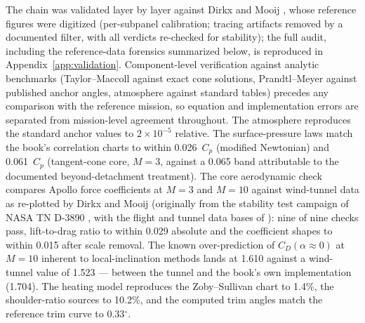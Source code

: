 The chain was validated layer by layer against Dirkx and Mooij
\cite{dirkx2017entry}, whose reference figures were digitized (per-subpanel
calibration; tracing artifacts removed by a documented filter, with all
verdicts re-checked for stability); the full audit, including the
reference-data forensics summarized below, is reproduced in
Appendix~\ref{app:validation}. Component-level verification against
analytic benchmarks (Taylor--Maccoll against exact cone solutions,
Prandtl--Meyer against published anchor angles, atmosphere against
standard tables) precedes any comparison with the reference mission, so
equation and implementation errors are separated from mission-level
agreement throughout. The atmosphere reproduces the standard
anchor values to $2\times10^{-5}$ relative. The surface-pressure laws match
the book's correlation charts to within 0.026~$C_p$ (modified Newtonian) and
0.061~$C_p$ (tangent-cone core, $M=3$, against a 0.065 band attributable to
the documented beyond-detachment treatment). The core aerodynamic check
compares Apollo force coefficients at $M=3$ and $M=10$ against wind-tunnel
data as re-plotted by Dirkx and Mooij (originally from the stability test
campaign of NASA TN D-3890 \cite{moseley1967d3890}, with the flight and
tunnel data bases of \cite{hillje1969apollo,moseley1969wind}): nine of nine
checks pass,
lift-to-drag ratio to within 0.029 absolute and the coefficient shapes to
within 0.015 after scale removal. The known over-prediction of
$C_D(\alpha\approx0)$ at $M=10$ inherent to local-inclination methods lands
at 1.610 against a wind-tunnel value of 1.523 --- between the tunnel and the
book's own implementation (1.704). The heating model reproduces the
Zoby--Sullivan chart to 1.4\%, the shoulder-ratio sources to 10.2\%, and the
computed trim angles match the reference trim curve to 0.33$^\circ$.

